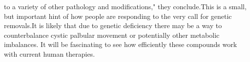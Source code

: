 \documentclass{article}
\begin{document}
to a variety of other pathology and modifications," they conclude.This is a small, but important hint of how people are responding to the very call for genetic removals.It is likely that due to genetic deficiency there may be a way to counterbalance cystic palbular movement or potentially other metabolic imbalances. It will be fascinating to see how efficiently these compounds work with current human therapies.
\end{document}
